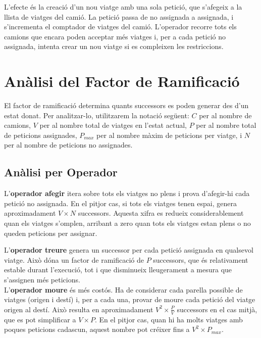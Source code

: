 L'efecte és la creació d'un nou viatge amb una sola petició, que s'afegeix a la llista de viatges del camió. La petició passa de no assignada a assignada, i s'incrementa el comptador de viatges del camió. L'operador recorre tots els camions que encara poden acceptar més viatges i, per a cada petició no assignada, intenta crear un nou viatge si es compleixen les restriccions.

\section{Anàlisi del Factor de Ramificació}

El factor de ramificació determina quants successors es poden generar des d'un estat donat. Per analitzar-lo, utilitzarem la notació següent: $C$ per al nombre de camions, $V$ per al nombre total de viatges en l'estat actual, $P$ per al nombre total de peticions assignades, $P_{max}$ per al nombre màxim de peticions per viatge, i $N$ per al nombre de peticions no assignades.

\subsection{Anàlisi per Operador}

L'\textbf{operador afegir} itera sobre tots els viatges no plens i prova d'afegir-hi cada petició no assignada. En el pitjor cas, si tots els viatges tenen espai, genera aproximadament $V \times N$ successors. Aquesta xifra es redueix considerablement quan els viatges s'omplen, arribant a zero quan tots els viatges estan plens o no queden peticions per assignar.

\vspace{0.5em}  
L'\textbf{operador treure} genera un successor per cada petició assignada en qualsevol viatge. Això dóna un factor de ramificació de $P$ successors, que és relativament estable durant l'execució, tot i que disminueix lleugerament a mesura que s'assignen més peticions.\\[0.5em] 

L'\textbf{operador moure} és més costós. Ha de considerar cada parella possible de viatges (origen i destí) i, per a cada una, provar de moure cada petició del viatge origen al destí. Això resulta en aproximadament $V^2 \times \frac{P}{V}$ successors en el cas mitjà, que es pot simplificar a $V \times P$. En el pitjor cas, quan hi ha molts viatges amb poques peticions cadascun, aquest nombre pot créixer fins a $V^2 \times P_{max}$.

